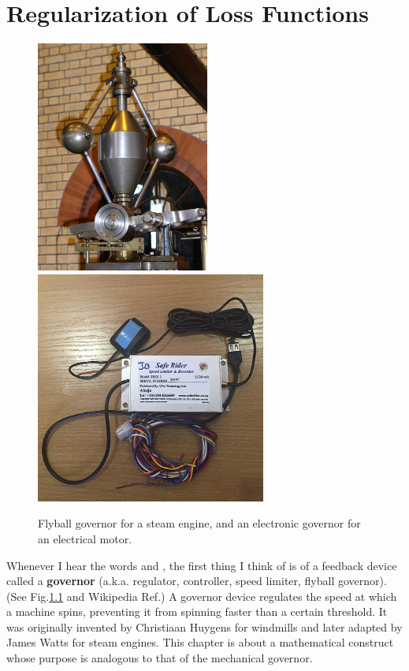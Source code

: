 \chapter{Regularization of Loss Functions}
\label{ch-regularization}

\begin{figure}[h!]
\centering
\includegraphics[height=3in]
{regularization/steam-guv.png}
\includegraphics[height=3in]
{regularization/electronic-guv.png}
\caption{Flyball governor for a steam engine, and an electronic governor for an electrical motor.}
\label{fig-guv-device}
\end{figure}

Whenever I hear the words  and , the first 
thing I think of is of a feedback device called a
{\bf governor} (a.k.a. regulator, controller, speed limiter, flyball governor). (See Fig.\ref{fig-guv-device} and Wikipedia Ref.\cite{wiki-guv-device})
A governor device regulates the speed at which 
a machine spins, preventing it from spinning faster than a certain threshold. It was originally invented by Christiaan Huygens for windmills and later adapted by James Watts for steam engines. This chapter is about a mathematical construct whose purpose is analogous to that of the mechanical governor.




